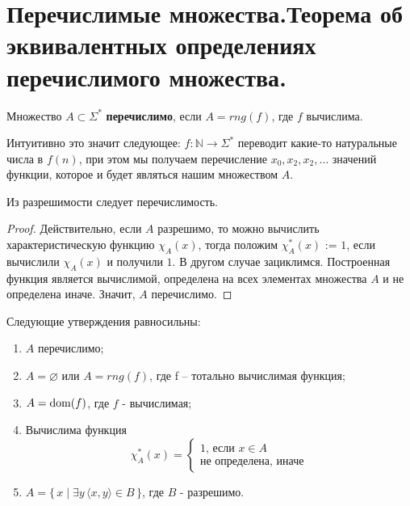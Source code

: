 \section{Перечислимые множества.Теорема об эквивалентных определениях перечислимого множества.}
\begin{definition}
	Множество $A \subset \Sigma^*$ \textbf{перечислимо}, если $A=rng(f)$, где $f$ вычислима.
\end{definition}
Интуитивно это значит следующее: $f\colon\mathbb{N}\to\Sigma^*$ переводит какие-то натуральные числа в $f(n)$, при
этом мы получаем перечисление $x_0, x_2, x_2,\ldots$ значений функции, которое и будет являться нашим
множеством $A$.

\begin{proposition}
	Из разрешимости следует перечислимость.
\end{proposition}
\begin{proof}
	Действительно, если $A$ разрешимо, то можно вычислить характеристическую функцию $\chi_{A}(x)$, тогда положим
	$\chi^*_{A}(x)$ := $1$, если вычислили  $\chi_{A}(x)$ и получили $1$. В другом случае зациклимся. Построенная
	функция является вычислимой, определена на всех элементах множества $A$ и не определена иначе. Значит, $A$
	перечислимо.
\end{proof}
\begin{theorem}
	Следующие утверждения равносильны:
	\begin{enumerate}
		\item $A$ перечислимо;
		\item $A = \varnothing $ или $A = rng(f)$, где f -- тотально вычислимая функция;
		\item $A = \operatorname{dom}(f)$, где $f$ - вычислимая;
		\item Вычислима функция
			\begin{equation*}
				\chi^*_{A}(x) = 
				\begin{cases}
					\text{1, если $x \in A$}\\
					\text{не определена, иначе}
				\end{cases}
			\end{equation*}
		\item $A = \{\,x\mid\exists y\,\langle x,y\rangle\in B\,\}$, где $B$ - разрешимо.
	\end{enumerate}
\end{theorem}
